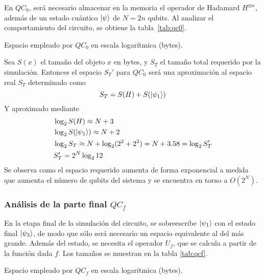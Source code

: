 En $QC_0$, será necesario almacenar en la memoria el operador de Hadamard 
$H^{\otimes n}$, además de un estado cuántico $\ket{\psi}$ de $N = 2n$ qubits.  
Al analizar el comportamiento del circuito, se obtiene la tabla~\ref{tab:qc0}.
%
\begin{table}[!htb]
\centering

\caption{Espacio empleado por $QC_0$ en escala logarítmica (bytes).}
\label{tab:qc0}
\end{table}
%
Sea $S(x)$ el tamaño del objeto $x$ en bytes, y $S_T$ el tamaño total requerido 
por la simulación. Entonces el espacio $S_T'$ para $QC_0$ será una aproximación 
al espacio real $S_T$ determinado como
$$ S_T = S(H) + S(\ket{\psi_{1}}) $$
Y aproximado mediante
\begin{equation*}
\begin{split}
	&\log_2 S(H) \approx N + 3 \\
	&\log_2 S(\ket{\psi_{1}})  \approx N + 2 \\
	&\log_2 S_T \approx N+\log_2 (2^2+2^3) = N+3.58 = \log_2 S_T' \\
	& S_T' = 2^{N} \log_2 12
\end{split}
\end{equation*}
Se observa como el espacio requerido aumenta de forma exponencial a medida que 
aumenta el número de qubits del sistema y se encuentra en torno a $O(2^N)$.



\subsubsection{Análisis de la parte final $QC_f$}
En la etapa final de la simulación del circuito, se sobreescribe $\ket{\psi_{1}}$ con 
el estado final $\ket{\psi_{3}}$, de modo que sólo será necesario un espacio 
equivalente al del más grande.
Además del estado, se necesita el operador $U_f$, que se calcula a partir de la 
función dada $f$. Los tamaños se muestran en la tabla \ref{tab:qcf}.
%
\begin{table}[!htb]
\centering

\caption{Espacio empleado por $QC_f$ en escala logarítmica (bytes).}
\label{tab:qcf}
\end{table}

